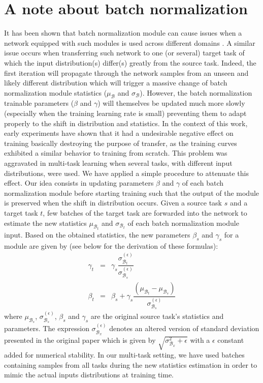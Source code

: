 \section{A note about batch normalization}
\label{app:mtask:sec:app:batch_norm}
It has been shown that batch normalization \cite{ioffe2015batch} module can cause issues when a network equipped with such modules is used across different domains \cite{li2018adaptive, chang2019domain}.  
A similar issue occurs when transferring such network to one (or several) target task of which the input distribution(s) differ(s) greatly from the source task. Indeed, the first iteration will propagate through the network samples from an unseen and likely different distribution which will trigger a massive change of batch normalization module statistics ($\mu_\mathcal{B}$ and $\sigma_\mathcal{B}$). However, the batch normalization trainable parameters ($\beta$ and $\gamma$) will themselves be updated much more slowly (especially when the training learning rate is small) preventing them to adapt properly to the shift in distribution and statistics. In the context of this work, early experiments have shown that it had a undesirable negative effect on training basically destroying the purpose of transfer, as the training curves exhibited a similar behavior to training from scratch. This problem was aggravated in multi-task learning when several tasks, with different input distributions, were used. We have applied a simple procedure to attenuate this effect. Our idea consists in updating parameters $\beta$ and $\gamma$ of each batch normalization module before starting training such that the output of the module is preserved when the shift in distribution occurs. Given a source task $s$ and a target task $t$, few batches of the target task are forwarded into the network to estimate the new statistics $\mu_{\mathcal{B}_t}$ and $\sigma_{\mathcal{B}_t}$ of each batch normalization module input. Based on the obtained statistics, the new parameters $\beta_s$ and $\gamma_s$ for a module are given by (see below for the derivation of these formulas):
\begin{eqnarray}
\gamma_t &=& \gamma_s \dfrac{\sigma^{(\epsilon)}_{\mathcal{B}_t}}{\sigma^{(\epsilon)}_{\mathcal{B}_s}}\label{app:mtask:eqn:bn_update_gamma}\\
\beta_t &=& \beta_s + \gamma_s  \dfrac{(\mu_{\mathcal{B}_t}-\mu_{\mathcal{B}_s})}{\sigma^{(\epsilon)}_{\mathcal{B}_s}}\label{app:mtask:eqn:bn_update_beta}
\end{eqnarray}
where $\mu_{\mathcal{B}_s}$, $\sigma^{(\epsilon)}_{\mathcal{B}_s}$, $\beta_s$ and $\gamma_s$ are the original source task's statistics and parameters. The expression $\sigma^{(\epsilon)}_{\mathcal{B}_x}$ denotes an altered version of standard deviation presented in the original paper which is given by $\sqrt{\sigma_{\mathcal{B}_x}^2 + \epsilon}$ with a $\epsilon$ constant added for numerical stability. In our multi-task setting, we have used batches containing samples from all tasks during the new statistics estimation in order to mimic the actual inputs distributions at training time.

